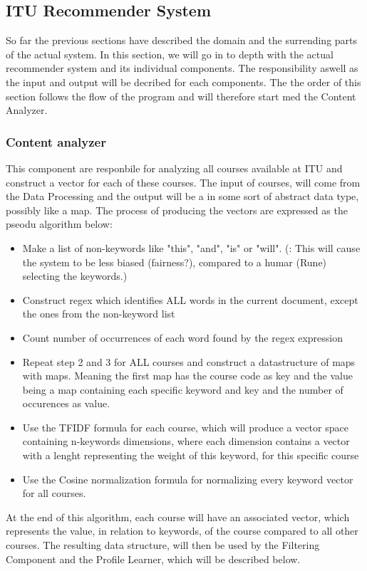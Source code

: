 \subsection{ITU Recommender System}
So far the previous sections have described the domain and the surrending parts of the actual system. In this section, we will go in to depth with the actual recommender system and its individual components. The responsibility aswell as the input and output will be decribed for each components. The the order of this section follows the flow of the program and will therefore start med the Content Analyzer.
\subsubsection{Content analyzer}
This component are responbile for analyzing all courses available at ITU and construct a vector for each of these courses. The input of courses, will come from the Data Processing  and the output will be a in some sort of abstract data type, possibly like a map. The process of producing the vectors are expressed as the pseodu algorithm below:
\begin{itemize}
	\item Make a list of non-keywords like "this", "and", "is" or "will". (: This will cause the system to be less biased (fairness?), compared to a humar (Rune) selecting the keywords.)
	\item Construct regex which identifies ALL words in the current document, except the ones from the non-keyword list
	\item Count number of occurrences of each word found by the regex expression
	\item Repeat step 2 and 3 for ALL courses and construct a datastructure of maps with maps. Meaning the first map has the course code as key and the value being a map containing each specific keyword and key and the number of occurences as value. 
	\item Use the TFIDF  formula for each course, which will produce a vector space containing n-keywords dimensions, where each dimension contains a vector with a lenght representing the weight of this keyword, for this specific course 
	\item Use the Cosine normalization formula for normalizing every keyword vector for all courses.
\end{itemize}
At the end of this algorithm, each course will have an associated vector, which represents the value, in relation to keywords, of the course compared to all other courses. The resulting data structure, will then be used by the Filtering Component and the Profile Learner, which will be described below.

